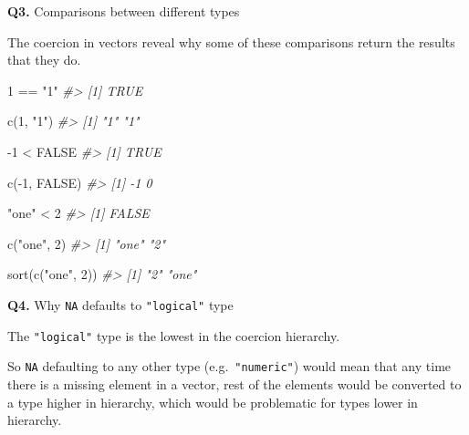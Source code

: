 \documentclass[
]{book}
\newenvironment{Shaded}{\begin{snugshade}}{\end{snugshade}}
\newcommand{\CommentTok}[1]{\textcolor[rgb]{0.56,0.35,0.01}{\textit{#1}}}
\newcommand{\ConstantTok}[1]{\textcolor[rgb]{0.00,0.00,0.00}{#1}}
\newcommand{\DecValTok}[1]{\textcolor[rgb]{0.00,0.00,0.81}{#1}}
\newcommand{\FunctionTok}[1]{\textcolor[rgb]{0.00,0.00,0.00}{#1}}
\newcommand{\NormalTok}[1]{#1}
\newcommand{\SpecialCharTok}[1]{\textcolor[rgb]{0.00,0.00,0.00}{#1}}
\newcommand{\StringTok}[1]{\textcolor[rgb]{0.31,0.60,0.02}{#1}}
\begin{document}
\textbf{Q3.} Comparisons between different types

The coercion in vectors reveal why some of these comparisons return the results that they do.

\begin{Shaded}
\begin{Highlighting}[]
\DecValTok{1} \SpecialCharTok{==} \StringTok{"1"}
\CommentTok{\#\textgreater{} [1] TRUE}

\FunctionTok{c}\NormalTok{(}\DecValTok{1}\NormalTok{, }\StringTok{"1"}\NormalTok{)}
\CommentTok{\#\textgreater{} [1] "1" "1"}
\end{Highlighting}
\end{Shaded}

\begin{Shaded}
\begin{Highlighting}[]
\SpecialCharTok{{-}}\DecValTok{1} \SpecialCharTok{\textless{}} \ConstantTok{FALSE}
\CommentTok{\#\textgreater{} [1] TRUE}

\FunctionTok{c}\NormalTok{(}\SpecialCharTok{{-}}\DecValTok{1}\NormalTok{, }\ConstantTok{FALSE}\NormalTok{)}
\CommentTok{\#\textgreater{} [1] {-}1  0}
\end{Highlighting}
\end{Shaded}

\begin{Shaded}
\begin{Highlighting}[]
\StringTok{"one"} \SpecialCharTok{\textless{}} \DecValTok{2}
\CommentTok{\#\textgreater{} [1] FALSE}

\FunctionTok{c}\NormalTok{(}\StringTok{"one"}\NormalTok{, }\DecValTok{2}\NormalTok{)}
\CommentTok{\#\textgreater{} [1] "one" "2"}

\FunctionTok{sort}\NormalTok{(}\FunctionTok{c}\NormalTok{(}\StringTok{"one"}\NormalTok{, }\DecValTok{2}\NormalTok{))}
\CommentTok{\#\textgreater{} [1] "2"   "one"}
\end{Highlighting}
\end{Shaded}

\textbf{Q4.} Why \texttt{NA} defaults to \texttt{"logical"} type

The \texttt{"logical"} type is the lowest in the coercion hierarchy.

So \texttt{NA} defaulting to any other type (e.g.~\texttt{"numeric"}) would mean that any time there is a missing element in a vector, rest of the elements would be converted to a type higher in hierarchy, which would be problematic for types lower in hierarchy.
\end{document}
